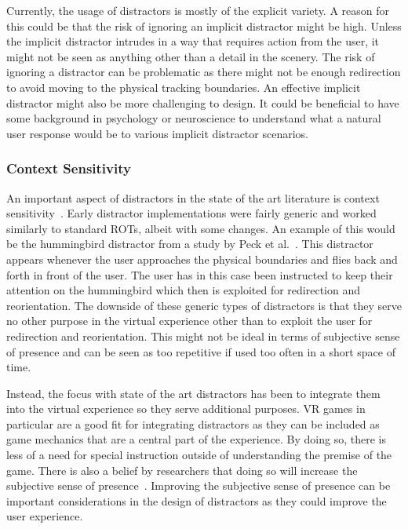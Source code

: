 Currently, the usage of distractors is mostly of the explicit variety. A reason for this could be that the risk of ignoring an implicit distractor might be high. Unless the implicit distractor intrudes in a way that requires action from the user, it might not be seen as anything other than a detail in the scenery. The risk of ignoring a distractor can be problematic as there might not be enough redirection to avoid moving to the physical tracking boundaries. An effective implicit distractor might also be more challenging to design. It could be beneficial to have some background in psychology or neuroscience to understand what a natural user response would be to various implicit distractor scenarios.  

\subsubsection{Context Sensitivity}
An important aspect of distractors in the state of the art literature is context sensitivity~\cite{chen2017towards, chen2017supporting, sra2018vmotion}. Early distractor implementations were fairly generic and worked similarly to standard ROTs, albeit with some changes. An example of this would be the hummingbird distractor from a study by Peck et al.~\cite{peck2011evaluation}. This distractor appears whenever the user approaches the physical boundaries and flies back and forth in front of the user. The user has in this case been instructed to keep their attention on the hummingbird which then is exploited for redirection and reorientation. The downside of these generic types of distractors is that they serve no other purpose in the virtual experience other than to exploit the user for redirection and reorientation. This might not be ideal in terms of subjective sense of presence and can be seen as too repetitive if used too often in a short space of time. 

Instead, the focus with state of the art distractors has been to integrate them into the virtual experience so they serve additional purposes. VR games in particular are a good fit for integrating distractors as they can be included as game mechanics that are a central part of the experience. By doing so, there is less of a need for special instruction outside of understanding the premise of the game. There is also a belief by researchers that doing so will increase the subjective sense of presence~\cite{chen2017supporting, sra2018vmotion}. Improving the subjective sense of presence can be important considerations in the design of distractors as they could improve the user experience. 

